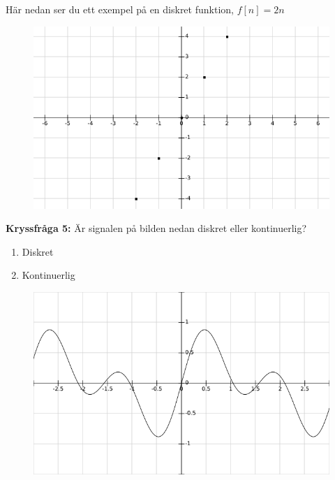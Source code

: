 \documentclass{article}
\begin{document}
Här nedan ser du ett exempel på en diskret funktion, $f[n]=2 n$
\begin{figure}[ht]
\centerline{\includegraphics[scale=0.55]{image10.png}}
\caption{}
\label{}
\end{figure}
\newpage

\textbf{Kryssfråga 5:} Är signalen på bilden nedan diskret eller kontinuerlig?
\begin{enumerate}[label={\alph*)},font={\bfseries}]
\item Diskret
\item Kontinuerlig
\end{enumerate}

\begin{figure}[ht]
\centerline{\includegraphics[scale=0.55]{image13.png}}
\caption{}
\label{}
\end{figure}
\end{document}
